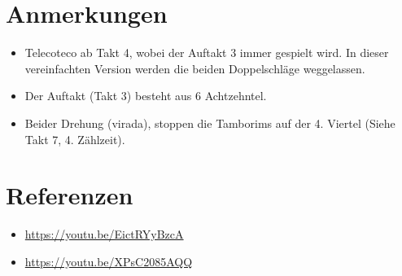 \documentclass[a4paper,12pt]{article}
\begin{document}
\section*{Anmerkungen}
\begin{itemize}
 \item Telecoteco ab Takt 4, wobei der Auftakt 3 immer gespielt wird. 
 In dieser vereinfachten Version werden die beiden Doppelschläge weggelassen.  
 \item Der Auftakt (Takt 3) besteht aus 6 Achtzehntel.
 \item Beider Drehung (virada), stoppen die Tamborims auf der 4. Viertel (Siehe Takt 7, 4. Zählzeit).
\end{itemize}

\section*{Referenzen}
\footnotesize
\begin{itemize}
 \item \url{https://youtu.be/EictRYyBzcA}
 \item \url{https://youtu.be/XPsC2085AQQ}
\end{itemize}
\end{document}
